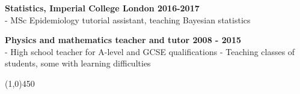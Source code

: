 \noindent \textbf{Statistics, Imperial College London \hfill 2016-2017}\\
- MSc Epidemiology tutorial assistant, teaching Bayesian statistics
\bigskip

\noindent \textbf{Physics and mathematics teacher and tutor \hfill 2008 - 2015}\\
- High school teacher for A-level and GCSE qualifications
- Teaching classes of students, some with learning difficulties	

\begin{center} \line(1,0){450} \end{center}